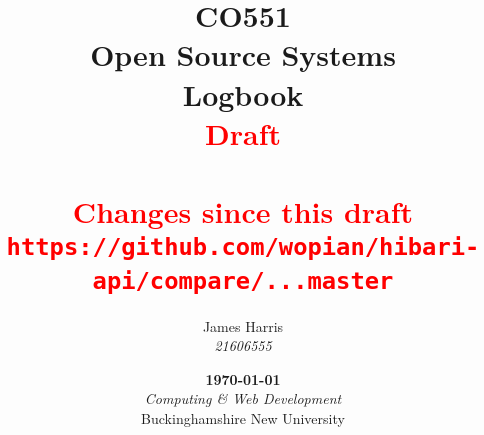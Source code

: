 \title{
  \Large CO551\\
  Open Source Systems\\
  \vspace*{.65cm}\huge Logbook\\
  \vspace*{.65cm}\large\textcolor{red}{Draft }\\
  \textcolor{red}{\DTMnow}\\
  \vspace*{.65cm}\normalsize\textcolor{red}{Changes since this draft}\\
  \textcolor{red}{\texttt{https://github.com/wopian/hibari-api/compare/\unskip...master}}
  \vfill
}
\author{
  James Harris\\
  \textit{21606555}
}
\date{
  \vfill\textbf\today\\
  \vspace*{.75cm}\textit{Computing \& Web Development}\\
  Buckinghamshire New University
}
\maketitle
{}
